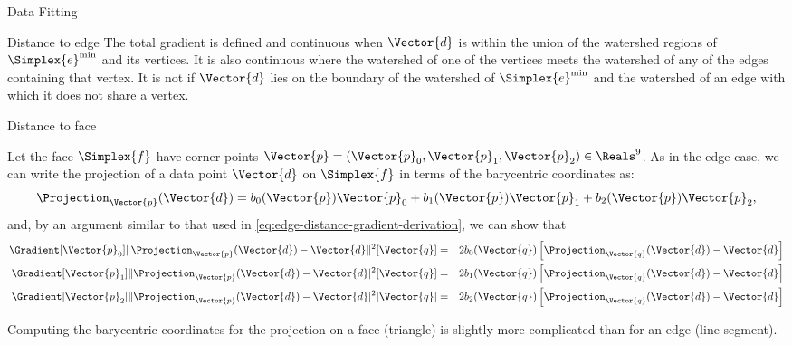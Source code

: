 \begin{plSection}{Data Fitting}
\begin{plSection}{Distance to edge}
The total gradient is defined and continuous
when $\Vector{d}$ is within the union of the watershed regions
of $\Simplex{e}^{\min}$ and its vertices.
It is also continuous where the watershed of one of the vertices
meets the watershed of any of the edges containing that vertex.
It is not if $\Vector{d}$ lies on the boundary of the
watershed of $\Simplex{e}^{\min}$ and the watershed of an
edge with which it does not share a vertex.

\end{plSection}%
\begin{plSection}{Distance to face}
\label{sec:Distance-to-face}

Let the face $\Simplex{f}$ have corner points 
$\Vector{p} = (\Vector{p}_0, \Vector{p}_1, \Vector{p}_2) \in \Reals^9$.
As in the edge case,
we can write the projection of a data point $\Vector{d}$ on $\Simplex{f}$
in terms of the barycentric coordinates as:
\begin{equation}
\Projection_\Vector{p} (\Vector{d}) = 
b_0(\Vector{p}) \Vector{p}_0 + b_1(\Vector{p}) \Vector{p}_1 
+ b_2(\Vector{p}) \Vector{p}_2,
\end{equation}
and, by an argument similar to that used in
\cref{eq:edge-distance-gradient-derivation},
we can show that
\begin{eqnarray}
\label{eq:face-distance-gradient}
\Gradient[\Vector{p}_0]
{ \| \Projection_{\Vector{p}} (\Vector{d}) - \Vector{d} \|^2 }
[\Vector{q}]
& = & 2 b_0(\Vector{q}) 
\left[ \Projection_{\Vector{q}} (\Vector{d}) - \Vector{d} \right]
\\
\Gradient[\Vector{p}_1]
{ \| \Projection_{\Vector{p}} (\Vector{d}) - \Vector{d}|^2 }
[\Vector{q}]
& = & 2 b_1(\Vector{q}) 
\left[ \Projection_\Vector{q} (\Vector{d}) - \Vector{d} \right]
\nonumber
\\
\Gradient[\Vector{p}_2]
{ \| \Projection_{\Vector{p}} (\Vector{d}) - \Vector{d}|^2 }
[\Vector{q}]
& = & 2 b_2(\Vector{q}) 
\left[ \Projection_\Vector{q} (\Vector{d}) - \Vector{d} \right]
\nonumber
\end{eqnarray}

Computing the barycentric coordinates for the projection
on a face (triangle) is slightly more complicated than
for an edge (line segment).


\end{plSection}
\end{plSection}
